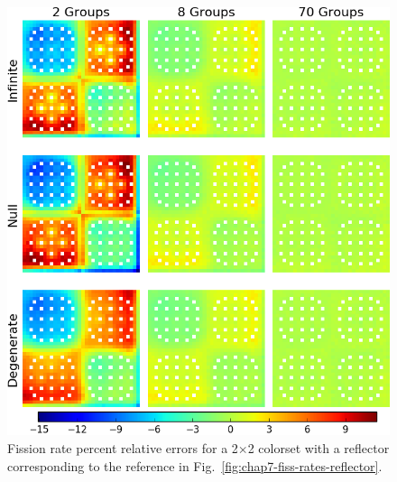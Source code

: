 \begin{appendices}
\begin{figure}[h!]
\centering
\includegraphics[width=\linewidth]{figures/quantification/appendix/reflector/fiss-err}
\vspace{2mm}
\caption[Fission rate errors for a 2$\times$2 colorset with a reflector]{Fission rate percent relative errors for a 2$\times$2 colorset with a reflector corresponding to the reference in Fig.~\ref{fig:chap7-fiss-rates-reflector}.}
\label{fig:quantify-reflector-fiss-err}
\end{figure}

\clearpage


\end{appendices}
